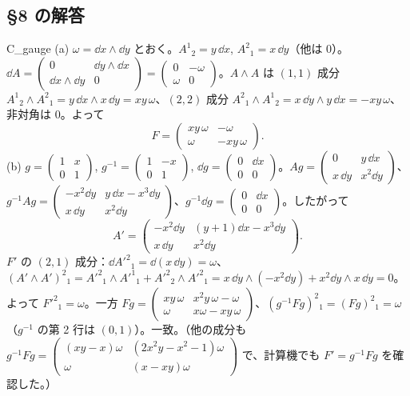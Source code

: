 \subsection*{§8 の解答}
\begin{soll}{C_gauge}
(a) $\omega=\dd x\wedge\dd y$ とおく。$A^1{}_2=y\,\dd x$, $A^2{}_1=x\,\dd y$（他は $0$）。$\dd A=\begin{pmatrix}0&\dd y\wedge\dd x\\\dd x\wedge\dd y&0\end{pmatrix}=\begin{pmatrix}0&-\omega\\\omega&0\end{pmatrix}$。$A\wedge A$ は $(1,1)$ 成分 $A^1{}_2\wedge A^2{}_1=y\,\dd x\wedge x\,\dd y=xy\,\omega$、$(2,2)$ 成分 $A^2{}_1\wedge A^1{}_2=x\,\dd y\wedge y\,\dd x=-xy\,\omega$、非対角は $0$。よって
\[
F=\begin{pmatrix}xy\,\omega&-\omega\\\omega&-xy\,\omega\end{pmatrix}.
\]
(b) $g=\begin{pmatrix}1&x\\0&1\end{pmatrix}$, $g^{-1}=\begin{pmatrix}1&-x\\0&1\end{pmatrix}$, $\dd g=\begin{pmatrix}0&\dd x\\0&0\end{pmatrix}$。$Ag=\begin{pmatrix}0&y\,\dd x\\x\,\dd y&x^2\dd y\end{pmatrix}$、$g^{-1}Ag=\begin{pmatrix}-x^2\dd y&y\,\dd x-x^3\dd y\\x\,\dd y&x^2\dd y\end{pmatrix}$、$g^{-1}\dd g=\begin{pmatrix}0&\dd x\\0&0\end{pmatrix}$。したがって
\[
A'=\begin{pmatrix}-x^2\dd y&(y+1)\dd x-x^3\dd y\\x\,\dd y&x^2\dd y\end{pmatrix}.
\]
$F'$ の $(2,1)$ 成分：$\dd A'^2{}_1=\dd(x\,\dd y)=\omega$、$(A'\wedge A')^2{}_1=A'^2{}_1\wedge A'^1{}_1+A'^2{}_2\wedge A'^2{}_1=x\,\dd y\wedge(-x^2\dd y)+x^2\dd y\wedge x\,\dd y=0$。よって $F'^2{}_1=\omega$。一方 $Fg=\begin{pmatrix}xy\,\omega&x^2y\,\omega-\omega\\\omega&x\omega-xy\,\omega\end{pmatrix}$、$(g^{-1}Fg)^2{}_1=(Fg)^2{}_1=\omega$（$g^{-1}$ の第 2 行は $(0,1)$）。一致。（他の成分も $g^{-1}Fg=\begin{pmatrix}(xy-x)\omega&(2x^2y-x^2-1)\omega\\\omega&(x-xy)\omega\end{pmatrix}$ で、計算機でも $F'=g^{-1}Fg$ を確認した。）

\end{soll}
